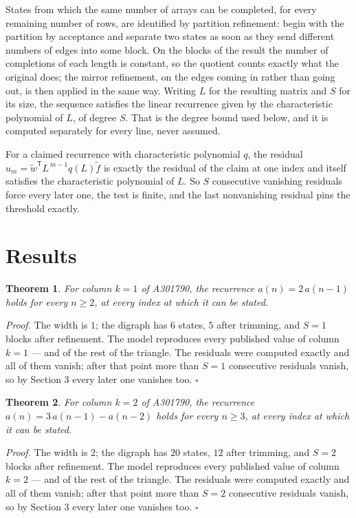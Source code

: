 \documentclass[11pt]{article}
\newtheorem{theorem}{Theorem}
\theoremstyle{definition}
\begin{document}
States from which the same number of arrays can be completed, for every remaining number of rows, are identified by partition refinement: begin with the partition by acceptance and separate two states as soon as they send different numbers of edges into some block. On the blocks of the result the number of completions of each length is constant, so the quotient counts exactly what the original does; the mirror refinement, on the edges coming in rather than going out, is then applied in the same way. Writing $L$ for the resulting matrix and $S$ for its size, the sequence satisfies the linear recurrence given by the characteristic polynomial of $L$, of degree $S$. That is the degree bound used below, and it is computed separately for every line, never assumed.

For a claimed recurrence with characteristic polynomial $q$, the residual $u_m = \tilde w^{\mathsf T}L^{\,m-1}q(L)\tilde f$ is exactly the residual of the claim at one index and itself satisfies the characteristic polynomial of $L$. So $S$ consecutive vanishing residuals force every later one, the test is finite, and the last nonvanishing residual pins the threshold exactly.

\section{Results}

\begin{theorem} For column $k = 1$ of A301790, the recurrence $a(n) = 2\,a(n-1)$ holds for every $n \ge 2$, at every index at which it can be stated.\end{theorem}

{\itshape Proof.} The width is $1$; the digraph has $6$ states, $5$ after trimming, and $S = 1$ blocks after refinement. The model reproduces every published value of column $k = 1$ --- and of the rest of the triangle. The residuals were computed exactly and all of them vanish; after that point more than $S = 1$ consecutive residuals vanish, so by Section 3 every later one vanishes too. $\square$

\begin{theorem} For column $k = 2$ of A301790, the recurrence $a(n) = 3\,a(n-1) - a(n-2)$ holds for every $n \ge 3$, at every index at which it can be stated.\end{theorem}

{\itshape Proof.} The width is $2$; the digraph has $20$ states, $12$ after trimming, and $S = 2$ blocks after refinement. The model reproduces every published value of column $k = 2$ --- and of the rest of the triangle. The residuals were computed exactly and all of them vanish; after that point more than $S = 2$ consecutive residuals vanish, so by Section 3 every later one vanishes too. $\square$
\end{document}
